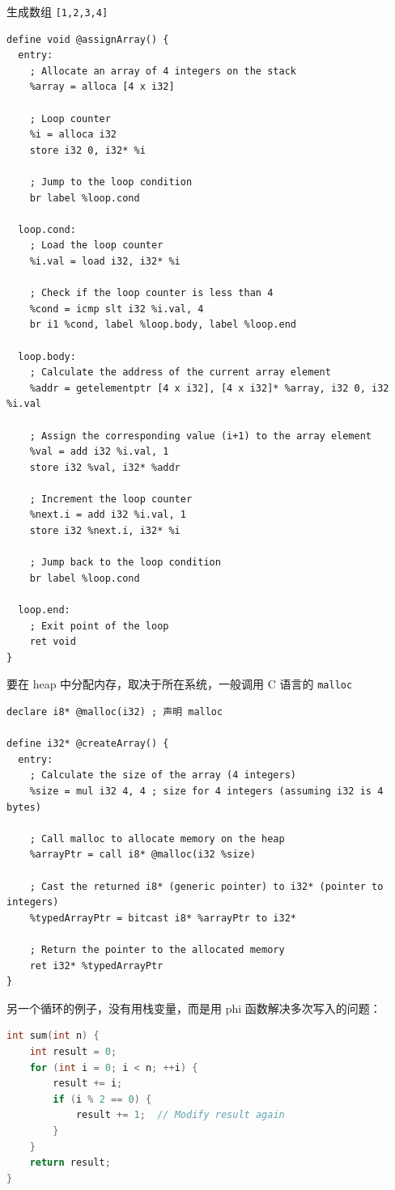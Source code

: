 生成数组 \verb`[1,2,3,4]`
\begin{lstlisting}[language=none]
define void @assignArray() {
  entry:
    ; Allocate an array of 4 integers on the stack
    %array = alloca [4 x i32]

    ; Loop counter
    %i = alloca i32
    store i32 0, i32* %i

    ; Jump to the loop condition
    br label %loop.cond

  loop.cond:
    ; Load the loop counter
    %i.val = load i32, i32* %i

    ; Check if the loop counter is less than 4
    %cond = icmp slt i32 %i.val, 4
    br i1 %cond, label %loop.body, label %loop.end

  loop.body:
    ; Calculate the address of the current array element
    %addr = getelementptr [4 x i32], [4 x i32]* %array, i32 0, i32 %i.val

    ; Assign the corresponding value (i+1) to the array element
    %val = add i32 %i.val, 1
    store i32 %val, i32* %addr

    ; Increment the loop counter
    %next.i = add i32 %i.val, 1
    store i32 %next.i, i32* %i

    ; Jump back to the loop condition
    br label %loop.cond

  loop.end:
    ; Exit point of the loop
    ret void
}
\end{lstlisting}

要在 heap 中分配内存，取决于所在系统，一般调用 C 语言的 \verb`malloc`
\begin{lstlisting}[language=none]
declare i8* @malloc(i32) ; 声明 malloc

define i32* @createArray() {
  entry:
    ; Calculate the size of the array (4 integers)
    %size = mul i32 4, 4 ; size for 4 integers (assuming i32 is 4 bytes)

    ; Call malloc to allocate memory on the heap
    %arrayPtr = call i8* @malloc(i32 %size)

    ; Cast the returned i8* (generic pointer) to i32* (pointer to integers)
    %typedArrayPtr = bitcast i8* %arrayPtr to i32*

    ; Return the pointer to the allocated memory
    ret i32* %typedArrayPtr
}
\end{lstlisting}


另一个循环的例子，没有用栈变量，而是用 phi 函数解决多次写入的问题：
\begin{lstlisting}[language=cpp]
int sum(int n) {
    int result = 0;
    for (int i = 0; i < n; ++i) {
        result += i;
        if (i % 2 == 0) {
            result += 1;  // Modify result again
        }
    }
    return result;
}
\end{lstlisting}

